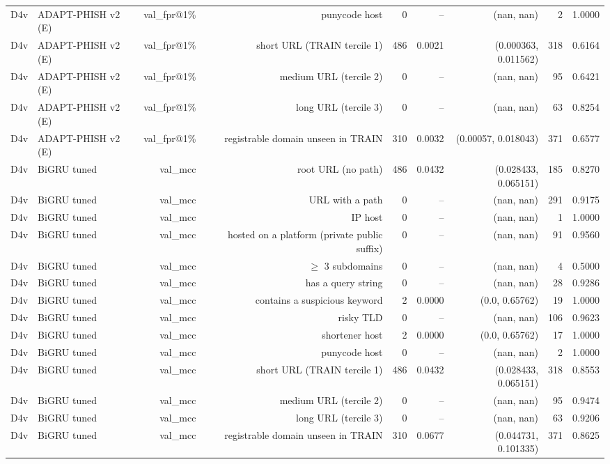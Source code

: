 \begin{table}[t]
\begin{tabular}{llrrrrrrr}
D4v & ADAPT-PHISH v2 (E) & val\_fpr@1\% & punycode host & 0 & -- & (nan, nan) & 2 & 1.0000 \\
D4v & ADAPT-PHISH v2 (E) & val\_fpr@1\% & short URL (TRAIN tercile 1) & 486 & 0.0021 & (0.000363, 0.011562) & 318 & 0.6164 \\
D4v & ADAPT-PHISH v2 (E) & val\_fpr@1\% & medium URL (tercile 2) & 0 & -- & (nan, nan) & 95 & 0.6421 \\
D4v & ADAPT-PHISH v2 (E) & val\_fpr@1\% & long URL (tercile 3) & 0 & -- & (nan, nan) & 63 & 0.8254 \\
D4v & ADAPT-PHISH v2 (E) & val\_fpr@1\% & registrable domain unseen in TRAIN & 310 & 0.0032 & (0.00057, 0.018043) & 371 & 0.6577 \\
D4v & BiGRU tuned & val\_mcc & root URL (no path) & 486 & 0.0432 & (0.028433, 0.065151) & 185 & 0.8270 \\
D4v & BiGRU tuned & val\_mcc & URL with a path & 0 & -- & (nan, nan) & 291 & 0.9175 \\
D4v & BiGRU tuned & val\_mcc & IP host & 0 & -- & (nan, nan) & 1 & 1.0000 \\
D4v & BiGRU tuned & val\_mcc & hosted on a platform (private public suffix) & 0 & -- & (nan, nan) & 91 & 0.9560 \\
D4v & BiGRU tuned & val\_mcc & $\geq$ 3 subdomains & 0 & -- & (nan, nan) & 4 & 0.5000 \\
D4v & BiGRU tuned & val\_mcc & has a query string & 0 & -- & (nan, nan) & 28 & 0.9286 \\
D4v & BiGRU tuned & val\_mcc & contains a suspicious keyword & 2 & 0.0000 & (0.0, 0.65762) & 19 & 1.0000 \\
D4v & BiGRU tuned & val\_mcc & risky TLD & 0 & -- & (nan, nan) & 106 & 0.9623 \\
D4v & BiGRU tuned & val\_mcc & shortener host & 2 & 0.0000 & (0.0, 0.65762) & 17 & 1.0000 \\
D4v & BiGRU tuned & val\_mcc & punycode host & 0 & -- & (nan, nan) & 2 & 1.0000 \\
D4v & BiGRU tuned & val\_mcc & short URL (TRAIN tercile 1) & 486 & 0.0432 & (0.028433, 0.065151) & 318 & 0.8553 \\
D4v & BiGRU tuned & val\_mcc & medium URL (tercile 2) & 0 & -- & (nan, nan) & 95 & 0.9474 \\
D4v & BiGRU tuned & val\_mcc & long URL (tercile 3) & 0 & -- & (nan, nan) & 63 & 0.9206 \\
D4v & BiGRU tuned & val\_mcc & registrable domain unseen in TRAIN & 310 & 0.0677 & (0.044731, 0.101335) & 371 & 0.8625 \\

\end{tabular}
\end{table}
